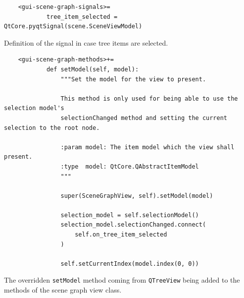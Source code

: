 \documentclass[10pt, openright, notitlepage]{scrreprt}
\begin{document}
\begin{listing}[H]
\begin{verbatim}
    <gui-scene-graph-signals>=
            tree_item_selected = QtCore.pyqtSignal(scene.SceneViewModel)
\end{verbatim}
\caption{\label{lst:gui-scene-graph-signals-01}
Definition of the signal in case tree items are selected.}
\end{listing}

\begin{listing}[H]
\begin{verbatim}
    <gui-scene-graph-methods>+=
            def setModel(self, model):
                """Set the model for the view to present.
            
                This method is only used for being able to use the selection model's
                selectionChanged method and setting the current selection to the root node.
            
                :param model: The item model which the view shall present.
                :type  model: QtCore.QAbstractItemModel
                """
            
                super(SceneGraphView, self).setModel(model)
            
                selection_model = self.selectionModel()
                selection_model.selectionChanged.connect(
                    self.on_tree_item_selected
                )
            
                self.setCurrentIndex(model.index(0, 0))
\end{verbatim}
\caption{\label{lst:gui-scene-graph-methods-set-model}
The overridden \texttt{setModel} method coming from \texttt{QTreeView} being added to the methods of the scene graph view class.}
\end{listing}
\end{document}
